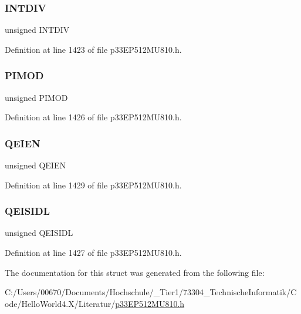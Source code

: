 \subsubsection{\texorpdfstring{I\+N\+T\+D\+IV}{INTDIV}}
{\footnotesize\ttfamily unsigned I\+N\+T\+D\+IV}



Definition at line 1423 of file p33\+E\+P512\+M\+U810.\+h.

\mbox{\label{structtag_q_e_i1_c_o_n_b_i_t_s_adcfde04c51defc9d36ec58e4c15cc28e}} 
\subsubsection{\texorpdfstring{P\+I\+M\+OD}{PIMOD}}
{\footnotesize\ttfamily unsigned P\+I\+M\+OD}



Definition at line 1426 of file p33\+E\+P512\+M\+U810.\+h.

\mbox{\label{structtag_q_e_i1_c_o_n_b_i_t_s_ad84b7ff5d720a8a5a8c3c04b9ffc346b}} 
\subsubsection{\texorpdfstring{Q\+E\+I\+EN}{QEIEN}}
{\footnotesize\ttfamily unsigned Q\+E\+I\+EN}



Definition at line 1429 of file p33\+E\+P512\+M\+U810.\+h.

\mbox{\label{structtag_q_e_i1_c_o_n_b_i_t_s_adf814839ec245aa961a874d878c37329}} 
\subsubsection{\texorpdfstring{Q\+E\+I\+S\+I\+DL}{QEISIDL}}
{\footnotesize\ttfamily unsigned Q\+E\+I\+S\+I\+DL}



Definition at line 1427 of file p33\+E\+P512\+M\+U810.\+h.



The documentation for this struct was generated from the following file\+:\begin{DoxyCompactItemize}
\item 
C\+:/\+Users/00670/\+Documents/\+Hochschule/\+\_\+\+Tier1/73304\+\_\+\+Technische\+Informatik/\+Code/\+Hello\+World4.\+X/\+Literatur/\hyperlink{p33_e_p512_m_u810_8h}{p33\+E\+P512\+M\+U810.\+h}\end{DoxyCompactItemize}
